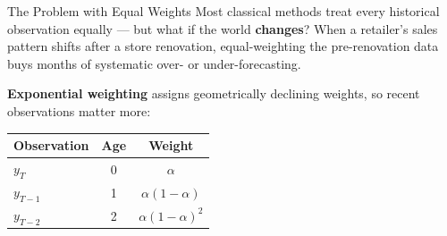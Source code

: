 \documentclass[aspectratio=169, 11pt]{beamer}
\begin{document}
\begin{frame}{The Problem with Equal Weights}
  Most classical methods treat every historical observation equally --- but
  what if the world \textbf{changes}? When a retailer's sales pattern shifts
  after a store renovation, equal-weighting the pre-renovation data buys months
  of systematic over- or under-forecasting.

  \vspace{0.1cm}
  \textbf{Exponential weighting} assigns geometrically declining weights, so
  recent observations matter more:
  \begin{center}
    {\small\begin{tabular}{lcc}
      \toprule
      Observation & Age & Weight \\
      \midrule
      $y_T$     & 0 & $\alpha$ \\
      $y_{T-1}$ & 1 & $\alpha(1-\alpha)$ \\
      $y_{T-2}$ & 2 & $\alpha(1-\alpha)^2$ \\
      \bottomrule
    \end{tabular}}
  \end{center}
  \muted{\small $\alpha \in (0,1]$ is the forgetting rate. High $\alpha$ = short
  memory; low $\alpha$ = long memory.}
\end{frame}
\end{document}
